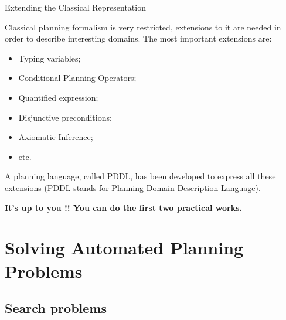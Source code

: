 \documentclass[9pt]{beamer}
\begin{document}
\begin{frame}{Extending the Classical Representation}
\begin{small}

Classical planning formalism is very restricted, extensions to it are needed in order to describe interesting domains. The most important extensions are:
\begin{itemize}
\item Typing variables;
\item Conditional Planning Operators;
\item Quantified expression;
\item Disjunctive preconditions;
\item Axiomatic Inference;
\item etc.
\end{itemize}

A planning language, called PDDL, has been developed to express all these extensions (PDDL stands for Planning Domain Description Language).
\end{small}
\end{frame}

\begin{frame}
\begin{center}
\textbf{\textcolor{CS-1light}{It's up to you !! You can do the first two practical works.}}
\end{center}
\end{frame}

\section{Solving Automated Planning Problems}

\subsection{Search problems}
\end{document}
